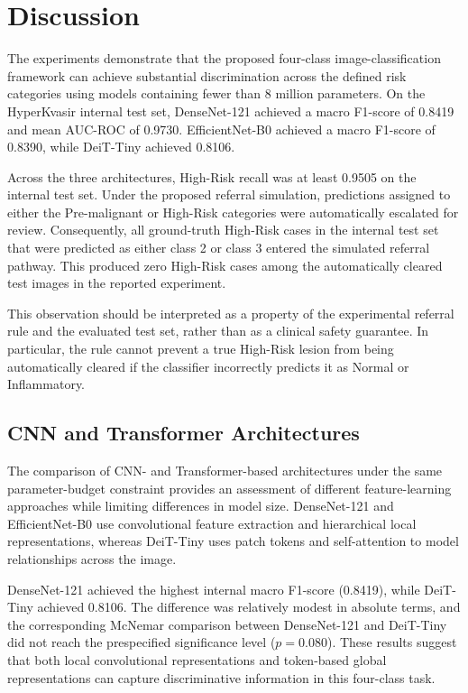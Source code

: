 \documentclass[11pt,a4paper]{article}
\begin{document}
\section{Discussion}
\label{sec:discussion}

The experiments demonstrate that the proposed four-class image-classification
framework can achieve substantial discrimination across the defined risk
categories using models containing fewer than 8 million parameters. On the
HyperKvasir internal test set, DenseNet-121 achieved a macro F1-score of
0.8419 and mean AUC-ROC of 0.9730. EfficientNet-B0 achieved a macro F1-score
of 0.8390, while DeiT-Tiny achieved 0.8106.

Across the three architectures, High-Risk recall was at least 0.9505 on the
internal test set. Under the proposed referral simulation, predictions assigned
to either the Pre-malignant or High-Risk categories were automatically
escalated for review. Consequently, all ground-truth High-Risk cases in the
internal test set that were predicted as either class 2 or class 3 entered
the simulated referral pathway. This produced zero High-Risk cases among the
automatically cleared test images in the reported experiment.

This observation should be interpreted as a property of the
experimental referral rule and the evaluated test set, rather than as
a clinical safety guarantee. In particular, the rule cannot prevent a true
High-Risk lesion from being automatically cleared if the classifier
incorrectly predicts it as Normal or Inflammatory.

\subsection{CNN and Transformer Architectures}

The comparison of CNN- and Transformer-based architectures under the same
parameter-budget constraint provides an assessment of different
feature-learning approaches while limiting differences in model size.
DenseNet-121 and EfficientNet-B0 use convolutional feature extraction and
hierarchical local representations, whereas DeiT-Tiny uses patch tokens and
self-attention to model relationships across the image.

DenseNet-121 achieved the highest internal macro F1-score (0.8419), while
DeiT-Tiny achieved 0.8106. The difference was relatively modest in absolute
terms, and the corresponding McNemar comparison between DenseNet-121 and
DeiT-Tiny did not reach the prespecified significance level ($p=0.080$).
These results suggest that both local convolutional representations and
token-based global representations can capture discriminative information
in this four-class task.
\end{document}
